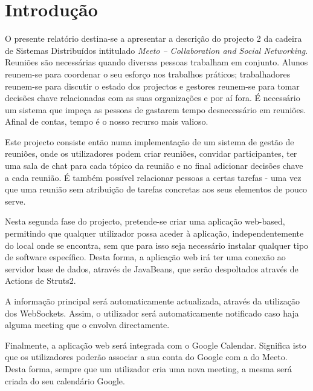\documentclass[12pt]{article} %
\begin{document}
\newpage %


\section{Introdução} %
\label{sec:intro}
O presente relatório destina-se a apresentar a descrição do projecto 2 da cadeira de Sistemas Distribuídos intitulado \emph{Meeto – Collaboration and Social Networking}.\\

Reuniões são necessárias quando diversas pessoas trabalham em conjunto. Alunos reunem-se para coordenar o seu esforço nos trabalhos práticos; trabalhadores reunem-se para discutir o estado dos projectos e gestores reunem-se para tomar decisões chave relacionadas com as suas organizações e por aí fora. É necessário um sistema que impeça as pessoas de gastarem tempo desnecessário em reuniões. Afinal de contas, tempo é o nosso recurso mais valioso.

Este projecto consiste então numa implementação de um sistema de gestão de reuniões, onde os utilizadores podem criar reuniões, convidar participantes, ter uma sala de chat para cada tópico da reunião e no final adicionar decisões chave a cada reunião. É também possível relacionar pessoas a certas tarefas - uma vez que uma reunião sem atribuição de tarefas concretas aos seus elementos de pouco serve.

Nesta segunda fase do projecto, pretende-se criar uma aplicação web-based, permitindo que qualquer utilizador possa aceder à aplicação, independentemente do local onde se encontra, sem que para isso seja necessário instalar qualquer tipo de software específico. Desta forma, a aplicação web irá ter uma conexão ao servidor base de dados, através de JavaBeans, que serão despoltados através de Actions de Struts2.

A informação principal será automaticamente actualizada, através da utilização dos WebSockets. Assim, o utilizador será automaticamente notificado caso haja alguma meeting que o envolva directamente.

Finalmente, a aplicação web será integrada com o Google Calendar. Significa isto que os utilizadores poderão associar a sua conta do Google com a do Meeto. Desta forma, sempre que um utilizador cria uma nova meeting, a mesma será criada do seu calendário Google.
\end{document}
